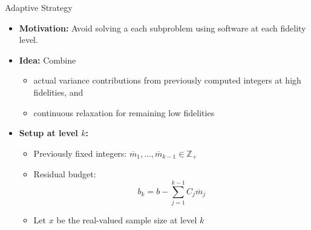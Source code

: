 \documentclass{beamer}
\begin{document}
\begin{frame}{Adaptive Strategy}

{\fontsize{10}{10}\selectfont
\begin{itemize}[leftmargin=5pt]
\item \textcolor{myblue3}{\bf Motivation:} Avoid solving a each subproblem using software at each fidelity level.
\item \textcolor{myblue3}{\bf Idea:} Combine
\begin{itemize}[leftmargin=15pt]
    \item[$\circ$]  actual variance contributions from previously computed integers at high fidelities, and
    \item[$\circ$]  continuous relaxation for remaining low fidelities
\end{itemize}

\item \textcolor{myblue3}{\bf Setup at level \(k\):}
\begin{itemize}[leftmargin=15pt]
    \item[$\circ$]  Previously fixed integers: \(\overline m_1,\dots,\overline m_{k-1} \in \mathbb{Z}_+\)
    \item[$\circ$]  Residual budget: 
    \[
    b_k = b - \sum_{j=1}^{k-1} C_j \overline m_j
    \]
    \item[$\circ$]  Let \(x\) be the real-valued sample size at level \(k\)
\end{itemize}

\end{itemize}
}
\end{frame}
\end{document}
